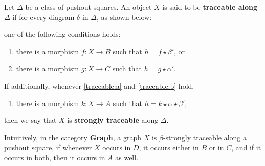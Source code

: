 \begin{definition}
    \label{def:traceability}
Let $\Delta$ be a class of pushout squares. 
An object $X$ is said to be \textbf{traceable along $\Delta$} if for every diagram $\delta$ in $\Delta$, as shown below:
\begin{center}
\end{center}
  one of the following conditions holds:
    \begin{enumerate}[label=(\alph*)]
        \item\label{traceable:a} there is a morphism $f : X \mathop{\to} B$ such that $h \mathop{=} f \mathop{\star} \beta'$, or
        \item\label{traceable:b} there is a morphism $g : X \mathop{\to} C$ such that $h \mathop{=} g \mathop{\star} \alpha'$.
    \end{enumerate}
    If additionally, 
    whenever \ref{traceable:a} and \ref {traceable:b} hold,
    \begin{enumerate}[label=(\alph*),resume]
        \item 
        there is a morphism $k : X \mathop{\to} A$ such that $h \mathop{=} k \mathop{\star} \alpha \mathop{\star} \beta' $,
    \end{enumerate}
    then we say that $X$ is \textbf{strongly traceable} along $\Delta$.
\end{definition}
Intuitively, in the category \textbf{Graph}, a graph $X$ is $\beta$-strongly traceable along a pushout square, if whenever $X$ occurs in $D$, it occurs either in $B$ or in $C$, and if it occurs in both, then it occurs in $A$ as well.

